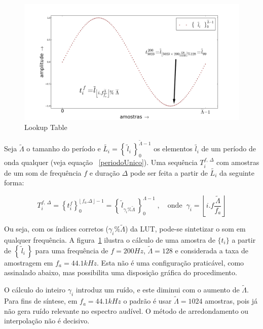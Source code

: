\begin{figure}[h!]
    \centering
        \includegraphics[width=\textwidth]{figuras/lut}
    \caption{Lookup Table}
        \label{fig:lut}
\end{figure}

Seja $\widetilde{\Lambda}$ o tamanho 
do período e $\widetilde{L_i} = \left\{\, \widetilde{l}_i \,\right\}_0^{\widetilde{\Lambda} -1}$ os elementos $\widetilde{l_i}$ de um
período de onda qualquer (veja equação ~\ref{periodoUnico}). Uma sequência
$T_i^{f,\,\Delta}$ com amostras de um som de frequência $f$ e duração $\Delta$
pode ser feita a partir de $\widetilde{L_i}$ da seguinte forma:

\begin{equation}
T_i^{f,\,\Delta}=\left\{t_i^f\right\}_0^{\lfloor \, f_a . \Delta \, \rfloor -1} = \left\{ \, \widetilde{l}_{\gamma_i \% \widetilde{\Lambda} }\, \right\}_{0}^{\Lambda-1}\; , \quad \text{onde} \;\; \gamma_i = \left \lfloor i . f \frac{ \widetilde{\Lambda}}{f_a} \right \rfloor  
\end{equation}

Ou seja, com os índices corretos ($\gamma_i\%\widetilde{\Lambda}$)
da LUT, pode-se sintetizar o som em qualquer frequência. 
A figura~\ref{fig:lut} ilustra
o cálculo de uma amostra de $\{t_i\}$ 
a partir de $\left\{\,\widetilde{l}_i\,\right\}$ para uma frequência
de $f=200Hz$, $\widetilde{\Lambda}=128$ e considerada a taxa de amostragem em $f_a=44.1kHz$.
Esta não é uma configuração praticável, como assinalado abaixo, mas possibilita uma
disposição gráfica do procedimento.


O cálculo do inteiro $\gamma_i$ introduz um ruído, 
e este diminui com o aumento de $\widetilde{\Lambda}$.
Para fins de síntese, em $f_a=44.1 kHz$
 o padrão é usar $\widetilde{\Lambda} = 1024$ amostras, pois já não gera ruído
 relevante no espectro audível. O método de arredondamento ou interpolação não é decisivo.\cite{Geiger}

